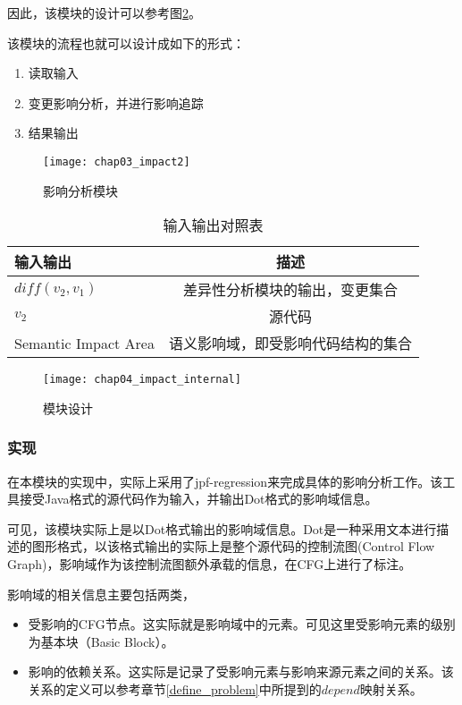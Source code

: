 因此，该模块的设计可以参考图\ref {des_impact}。

该模块的流程也就可以设计成如下的形式：
\begin{enumerate}
	\item 读取输入
	\item 变更影响分析，并进行影响追踪
	\item 结果输出
\end{enumerate}

\begin{figure}[H]
	\centering
	\texttt{[image: chap03\_impact2]}
	\caption {影响分析模块}
	\label {impact}	
\end{figure}


\begin{table}[H]
	\caption{输入输出对照表}
	\label{impact_io}
	\centering
	\begin{tabular}{lc}
		\toprule[1.5pt]
		{\heiti 输入输出} & {\heiti 描述} \\\midrule[1pt]
		$diff(v_2,v_1)$ & 差异性分析模块的输出，变更集合 \\
		$v_2$ & 源代码 \\
		Semantic Impact Area & 语义影响域，即受影响代码结构的集合\\
		\bottomrule[1.5pt]
	\end{tabular}
\end{table}

\begin{figure}[H]
	\centering
	\texttt{[image: chap04\_impact\_internal]}
	\caption {模块设计}
	\label {des_impact}	
\end{figure}

\subsubsection{实现}


在本模块的实现中，实际上采用了jpf-regression来完成具体的影响分析工作。该工具接受Java格式的源代码作为输入，并输出Dot格式的影响域信息。

可见，该模块实际上是以Dot格式输出的影响域信息。Dot是一种采用文本进行描述的图形格式，以该格式输出的实际上是整个源代码的控制流图(Control Flow Graph)，影响域作为该控制流图额外承载的信息，在CFG上进行了标注。

影响域的相关信息主要包括两类，
\begin{itemize}
	\item 受影响的CFG节点。这实际就是影响域中的元素。可见这里受影响元素的级别为基本块（Basic Block）。
	\item 影响的依赖关系。这实际是记录了受影响元素与影响来源元素之间的关系。该关系的定义可以参考章节\ref {define_problem}中所提到的$depend$映射关系。
\end{itemize}

